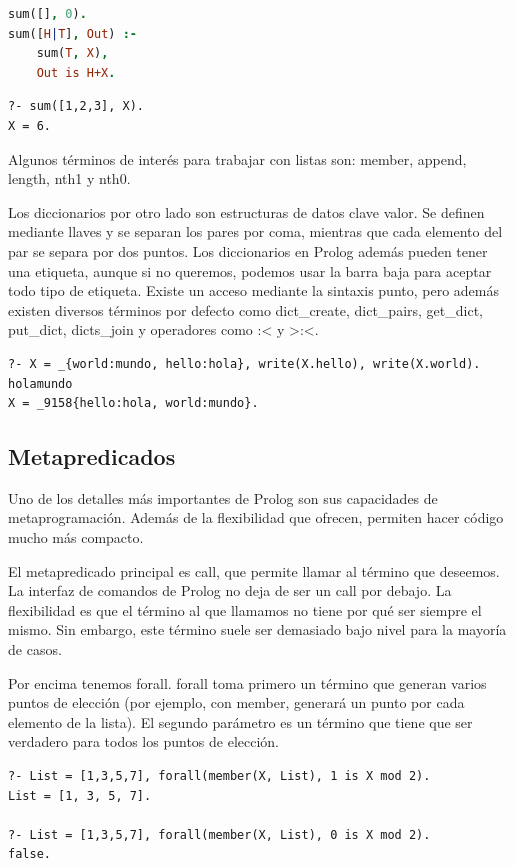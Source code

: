 \documentclass[12pt]{report} %
\begin{document}
\begin{lstlisting}[language=Prolog]
sum([], 0).
sum([H|T], Out) :-
    sum(T, X),
    Out is H+X.
\end{lstlisting}

\begin{lstlisting}
?- sum([1,2,3], X).
X = 6.
\end{lstlisting}

Algunos términos de interés para trabajar con listas son: member, append, length, nth1 y nth0.

Los diccionarios por otro lado son estructuras de datos clave valor. Se definen mediante llaves y se separan los pares por coma, mientras que cada elemento del par se separa por dos puntos. Los diccionarios en Prolog además pueden tener una etiqueta, aunque si no queremos, podemos usar la barra baja para aceptar todo tipo de etiqueta. Existe un acceso mediante la sintaxis punto, pero además existen diversos términos por defecto como dict\_create, dict\_pairs, get\_dict, put\_dict, dicts\_join y operadores como :< y >:<.

\begin{lstlisting}
?- X = _{world:mundo, hello:hola}, write(X.hello), write(X.world).
holamundo
X = _9158{hello:hola, world:mundo}.
\end{lstlisting}

\subsection{Metapredicados}

Uno de los detalles más importantes de Prolog son sus capacidades de metaprogramación. Además de la flexibilidad que ofrecen, permiten hacer código mucho más compacto.

El metapredicado principal es call, que permite llamar al término que deseemos. La interfaz de comandos de Prolog no deja de ser un call por debajo. La flexibilidad es que el término al que llamamos no tiene por qué ser siempre el mismo. Sin embargo, este término suele ser demasiado bajo nivel para la mayoría de casos.

Por encima tenemos forall. forall toma primero un término que generan varios puntos de elección (por ejemplo, con member, generará un punto por cada elemento de la lista). El segundo parámetro es un término que tiene que ser verdadero para todos los puntos de elección.

\begin{lstlisting}
?- List = [1,3,5,7], forall(member(X, List), 1 is X mod 2).
List = [1, 3, 5, 7].

?- List = [1,3,5,7], forall(member(X, List), 0 is X mod 2).
false.
\end{lstlisting}
\end{document}
